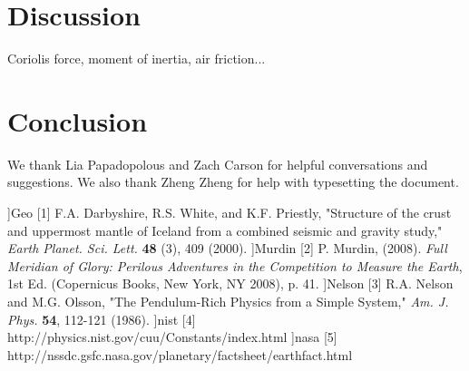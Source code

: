 \documentclass[iop]{emulateapj}
\begin{document}











\section{Discussion}
\label{sec:discuss}

Coriolis force, moment of inertia, air friction...














\section{Conclusion}














\acknowledgments

We thank Lia Papadopolous and Zach Carson for helpful conversations and 
suggestions.  We also thank Zheng Zheng for help with typesetting the 
document.






\begin{thebibliography}{}

\bibitem[[1]]{Geo}
[1] F.A. Darbyshire, R.S. White, and K.F. Priestly, "Structure of the crust and uppermost mantle of Iceland from a combined seismic and gravity study," {\it Earth Planet. Sci. Lett.} {\bf 48} (3), 409 (2000).
\bibitem[[2]]{Murdin}
[2] P. Murdin, (2008). {\it Full Meridian of Glory: Perilous Adventures in the Competition to Measure the Earth}, 1st Ed. (Copernicus Books, New York, NY 2008), p. 41.
\bibitem[[3]]{Nelson}
[3] R.A. Nelson and M.G. Olsson, "The Pendulum-Rich Physics from a Simple System," {\it Am. J. Phys.} {\bf 54}, 112-121 (1986).
\bibitem[[4]]{nist}
[4] http://physics.nist.gov/cuu/Constants/index.html
\bibitem[[5]]{nasa}
[5] http://nssdc.gsfc.nasa.gov/planetary/factsheet/earthfact.html


\end{thebibliography}{}
\end{document}
